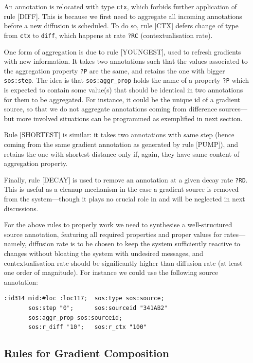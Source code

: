 \documentclass[12pt,a4paper,twoside,openright]{book}
\begin{document}
An annotation is relocated with type \texttt{ctx}, which forbids further application of rule [DIFF].
%
This is because we first need to aggregate all incoming annotations before a new diffusion is scheduled.
%
To do so, rule [CTX] defers change of type from \texttt{ctx} to \texttt{diff}, which happens at rate \texttt{?RC} (contextualisation rate).

One form of aggregation is due to rule [YOUNGEST], used to refresh gradients with new information.
%
It takes two annotations such that the values associated to the aggregation property \texttt{?P} are the same, and retains the one with bigger \texttt{sos:step}.
%
The idea is that \texttt{sos:aggr\_prop} holds the name of a property \texttt{?P} which is expected to contain some value(s) that should be identical in two annotations for them to be aggregated.
%
For instance, it could be the unique id of a gradient source, so that we do not aggregate annotations coming from difference sources---but more involved situations can be programmed as exemplified in next section.

Rule [SHORTEST] is similar: it takes two annotations with same step (hence coming from the same gradient annotation as generated by rule [PUMP]), and retains the one with shortest distance only if, again, they have same content of aggregation property.

Finally, rule [DECAY] is used to remove an annotation at a given decay rate \texttt{?RD}. This is useful as a cleanup mechanism in the case a gradient source is removed from the system---though it plays no crucial role in and will be neglected in next discussions.

For the above rules to properly work we need to synthesise a well-structured source annotation, featuring all required properties and proper values for rates---namely, diffusion rate is to be chosen to keep the system sufficiently reactive to changes without bloating the system with undesired messages, and contextualisation rate should be significantly higher than diffusion rate (at least one order of magnitude).
%
For instance we could use the following source annotation:

{\begin{verbatim}
:id314 mid:#loc :loc117;  sos:type sos:source; 
       sos:step "0";      sos:sourceid "341AB2"
       sos:aggr_prop sos:sourceid; 
       sos:r_diff "10";   sos:r_ctx "100"
\end{verbatim}}



\subsection{Rules for Gradient Composition}
\end{document}
